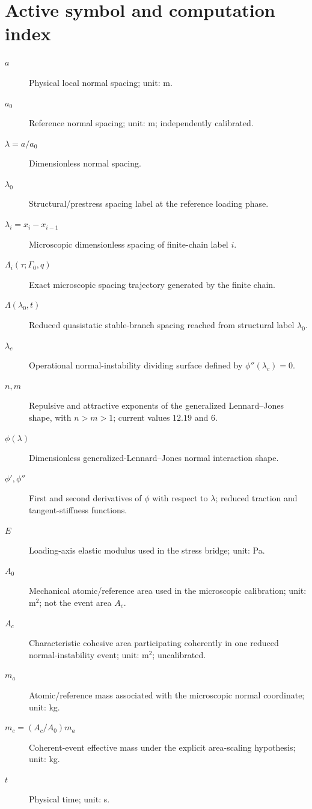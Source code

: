 \section*{Active symbol and computation index}

\begin{description}
\item[$a$] Physical local normal spacing; unit: m.
\item[$a_0$] Reference normal spacing; unit: m; independently calibrated.
\item[$\lambda=a/a_0$] Dimensionless normal spacing.
\item[$\lambda_0$] Structural/prestress spacing label at the reference loading phase.
\item[$\lambda_i=x_i-x_{i-1}$] Microscopic dimensionless spacing of finite-chain label $i$.
\item[$\Lambda_i(\tau;\Gamma_0,q)$] Exact microscopic spacing trajectory generated by the finite chain.
\item[$\Lambda(\lambda_0,t)$] Reduced quasistatic stable-branch spacing reached from structural label $\lambda_0$.
\item[$\lambda_c$] Operational normal-instability dividing surface defined by $\phi''(\lambda_c)=0$.
\item[$n,m$] Repulsive and attractive exponents of the generalized Lennard--Jones shape, with $n>m>1$; current values $12.19$ and $6$.
\item[$\phi(\lambda)$] Dimensionless generalized-Lennard--Jones normal interaction shape.
\item[$\phi',\phi''$] First and second derivatives of $\phi$ with respect to $\lambda$; reduced traction and tangent-stiffness functions.
\item[$E$] Loading-axis elastic modulus used in the stress bridge; unit: Pa.
\item[$A_0$] Mechanical atomic/reference area used in the microscopic calibration; unit: m$^2$; not the event area $A_c$.
\item[$A_c$] Characteristic cohesive area participating coherently in one reduced normal-instability event; unit: m$^2$; uncalibrated.
\item[$m_a$] Atomic/reference mass associated with the microscopic normal coordinate; unit: kg.
\item[$m_c=(A_c/A_0)m_a$] Coherent-event effective mass under the explicit area-scaling hypothesis; unit: kg.
\item[$t$] Physical time; unit: s.

\end{description}

